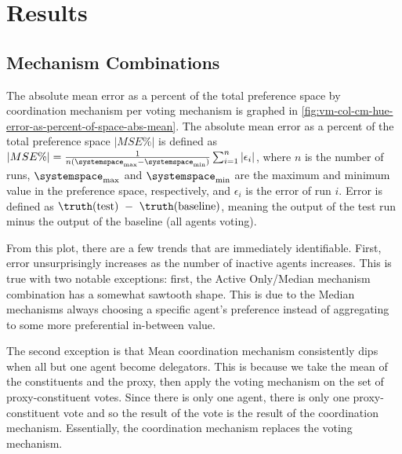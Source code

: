 \section{Results}\label{sec:results}

\subsection{Mechanism Combinations}\label{subsec:mechanism-combinations}
The absolute mean error as a percent of the total preference space by coordination
mechanism per voting mechanism is graphed in
\autoref{fig:vm-col-cm-hue-error-as-percent-of-space-abs-mean}.
The absolute mean error as a percent of the total preference space
$\lvert MSE\% \rvert$  is defined as
$
    \lvert MSE\% \rvert =
    \frac{1}{n (\systemspace_{\max} - \systemspace_{\min})}
        \sum^{n}_{i = 1}{\lvert \epsilon_i  \rvert}
$,
where $n$ is the number of runs, $\systemspace_{\max}$ and $\systemspace_{\min}$ are
the maximum and minimum value in the preference space, respectively, and $\epsilon_i$
is the error of run $i$.
Error is defined as $\truthof{\text{test}}~-~\truthof{\text{baseline}}$, meaning
the output of the test run minus the output of the baseline (all agents voting).

From this plot, there are a few trends that are immediately identifiable.
First, error unsurprisingly increases as the number of inactive agents increases.
This is true with two notable exceptions: first, the Active Only/Median
mechanism combination has a somewhat sawtooth shape.
This is due to the Median mechanisms always choosing a specific agent's preference
instead of aggregating to some more preferential in-between value.  

The second exception is that Mean coordination mechanism consistently dips when all but
one agent become delegators. 
This is because we take the mean of the constituents and the proxy, then apply the
voting mechanism on the set of proxy-constituent votes.
Since there is only one agent, there is only one proxy-constituent vote and so the
result of the vote is the result of the coordination mechanism.
Essentially, the coordination mechanism replaces the voting mechanism.


